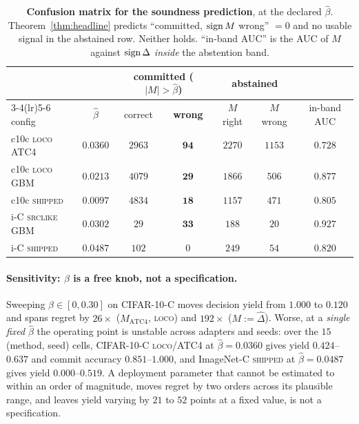 \begin{table}[t]\centering\scriptsize
\caption{\textbf{Confusion matrix for the soundness prediction}, at the declared $\widehat\beta$.
Theorem~\ref{thm:headline} predicts ``committed, $\operatorname{sign} M$ wrong'' $=0$ and no usable signal in the
abstained row. Neither holds. ``in-band AUC'' is the AUC of $M$ against $\operatorname{sign}\Delta$ \emph{inside}
the abstention band.}
\label{tab:beta-confusion}
\setlength{\tabcolsep}{3.5pt}
\begin{tabular}{@{}lcccccc@{}}
\toprule
& & \multicolumn{2}{c}{committed ($|M|>\widehat\beta$)} & \multicolumn{2}{c}{abstained} & \\
\cmidrule(lr){3-4}\cmidrule(lr){5-6}
config & $\widehat\beta$ & correct & \textbf{wrong} & $M$ right & $M$ wrong & in-band AUC \\
\midrule
c10c \textsc{loco} ATC4 & $0.0360$ & $2963$ & $\mathbf{94}$ & $2270$ & $1153$ & $0.728$ \\
c10c \textsc{loco} GBM & $0.0213$ & $4079$ & $\mathbf{29}$ & $1866$ & $506$ & $0.877$ \\
c10c \textsc{shipped} & $0.0097$ & $4834$ & $\mathbf{18}$ & $1157$ & $471$ & $0.805$ \\
\midrule
i-C \textsc{srclike} GBM & $0.0302$ & $29$ & $\mathbf{33}$ & $188$ & $20$ & $0.927$ \\
i-C \textsc{shipped} & $0.0487$ & $102$ & $0$ & $249$ & $54$ & $0.820$ \\
\bottomrule
\end{tabular}
\end{table}

\paragraph{Sensitivity: $\beta$ is a free knob, not a specification.} Sweeping
$\beta\in[0,0.30]$ on CIFAR-10-C moves decision yield from $1.000$ to $0.120$ and spans regret by
$26\times$ ($M_{\mathrm{ATC4}}$, \textsc{loco}) and $192\times$ ($M:=\widehat\Delta$). Worse, at a
\emph{single fixed} $\widehat\beta$ the operating point is unstable across adapters and seeds: over
the $15$ (method, seed) cells, CIFAR-10-C \textsc{loco}/ATC4 at $\widehat\beta=0.0360$ gives yield
$0.424$--$0.637$ and commit accuracy $0.851$--$1.000$, and ImageNet-C \textsc{shipped} at
$\widehat\beta=0.0487$ gives yield $0.000$--$0.519$. A deployment parameter that cannot be estimated
to within an order of magnitude, moves regret by two orders across its plausible range, and leaves
yield varying by $21$ to $52$ points at a fixed value, is not a specification.

